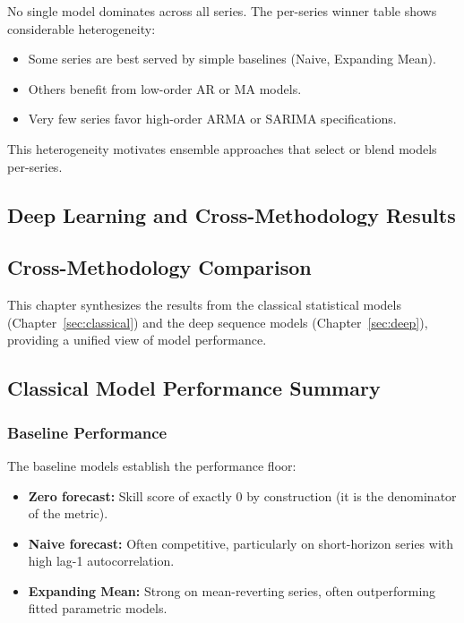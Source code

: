 No single model dominates across all series. The per-series winner table shows considerable heterogeneity:
\begin{itemize}
    \item Some series are best served by simple baselines (Naive, Expanding Mean).
    \item Others benefit from low-order AR or MA models.
    \item Very few series favor high-order ARMA or SARIMA specifications.
\end{itemize}

This heterogeneity motivates ensemble approaches that select or blend models per-series.

\subsection{Deep Learning and Cross-Methodology Results}
\label{sec:results}

\subsection{Cross-Methodology Comparison}

This chapter synthesizes the results from the classical statistical models (Chapter~\ref{sec:classical}) and the deep sequence models (Chapter~\ref{sec:deep}), providing a unified view of model performance.

\subsection{Classical Model Performance Summary}

\subsubsection{Baseline Performance}

The baseline models establish the performance floor:

\begin{itemize}
    \item \textbf{Zero forecast:} Skill score of exactly 0 by construction (it is the denominator of the metric).
    \item \textbf{Naive forecast:} Often competitive, particularly on short-horizon series with high lag-1 autocorrelation.
    \item \textbf{Expanding Mean:} Strong on mean-reverting series, often outperforming fitted parametric models.
\end{itemize}

